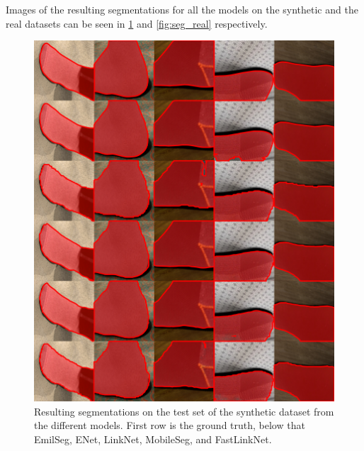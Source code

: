 \documentclass{kththesis}
\begin{document}
Images of the resulting segmentations for all the models on the synthetic and the real datasets can
be seen in \cref{fig:seg_test} and \cref{fig:seg_real} respectively.

 \begin{figure}[h]
  \centering
  \includegraphics[width=\textwidth]{test_color}
  \caption{Resulting segmentations on the test set of the synthetic dataset from the different models. First row is the ground
    truth, below that EmilSeg, ENet, LinkNet, MobileSeg, and FastLinkNet.}
  \label{fig:seg_test}
  \end{figure}
\end{document}
